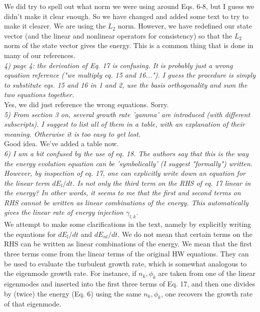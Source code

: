 \documentclass[12pt]{article}
\begin{document}
We did try to spell out what norm we were using around Eqs. 6-8, but I guess we didn't make it clear enough. So we have changed and added some text to try to make it clearer. We are using the $L_2$ norm. However, we have redefined our state vector (and the linear and nonlinear operators for consistency) so that the $L_2$ norm of the state vector gives the energy. This is a common thing that is done in many of our references.\\

\emph{4) page 4: the derivation of Eq. 17 is confusing. It is probably just a wrong equation reference ("we multiply eq. 15 and 16..."). I guess the procedure is simply to substitute eqs. 15 and 16 in 1 and 2, use the basis orthogonality and sum the two equations together. }\\

Yes, we did just reference the wrong equations. Sorry.\\

\emph{5) From section 3 on, several growth rate 'gamma' are introduced (with different subscripts). I suggest to list all of them in a table, with an explanation of their meaning. Otherwise it is too easy to get lost. }\\

Good idea. We've added a table now.\\

\emph{6) I am a bit confused by the use of eq. 18. The authors say that this is the way the energy evolution equation can be 'symbolically' (I suggest "formally") written. However, by inspection of eq. 17, one can explicitly write down an equation for the linear term $dE_l/dt$. Is not only the third term on the RHS of eq. 17 linear in the energy? In other words, it seems to me that the first and second terms on RHS cannot be written as linear combinations of the energy. This automatically gives the linear rate of energy injection $\gamma_{l,k}$. }\\

We attempt to make some clarifications in the text, namely by explicitly writing the equations for $dE_l/dt$ and $dE_{nl}/dt$. We do not mean that certain terms on the RHS
can be written as linear combinations of the energy. We mean that the first three terms come from the linear terms of the original HW equations. 
They can be used to evaluate the turbulent growth rate, which is somewhat analogous to the eigenmode growth rate. For instance, if $n_k, \phi_k$ are taken from one of the linear
eigenmodes and inserted into the first three terms of Eq. 17, and then one divides by (twice) the energy (Eq. 6) using the same $n_k, \phi_k$, one recovers the growth rate of that eigenmode.\\
\end{document}
